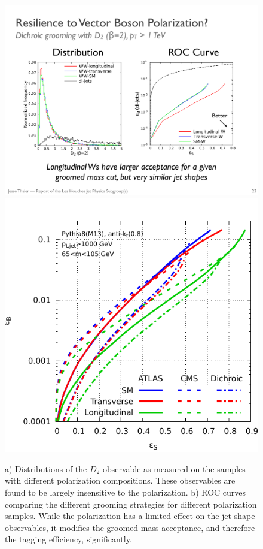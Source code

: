 \documentclass[11pt,letterpaper]{article}
\begin{document}


\begin{figure}
\begin{center}
\includegraphics[width=0.4\columnwidth]{figures/ROC_polarization}
  \hfill
\includegraphics[width=0.4\columnwidth]{figures/polarisation-basic-rocs}
\end{center}
\caption{a) Distributions of the $D_2$ observable as measured on the samples with different polarization compositions. These observables are found to be largely insensitive to the polarization. b) ROC curves comparing the different grooming strategies for different polarization samples. While the polarization has a limited effect on the jet shape observables, it modifies the groomed mass acceptance, and therefore the tagging efficiency, significantly.}\label{fig:polarization_roc}
\end{figure}
\end{document}
